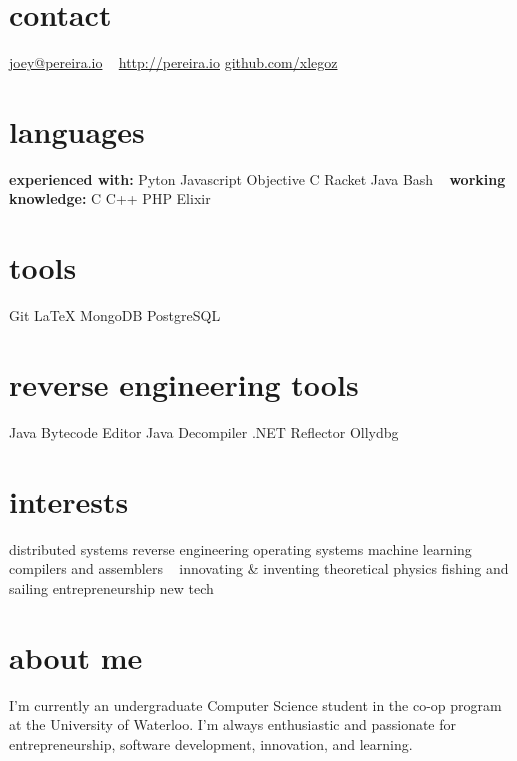 \documentclass[]{friggeri-cv-short}
\begin{document}

\begin{aside}
  \section{contact}
    \href{mailto:joey@pereira.io}{joey@pereira.io}
    ~
    \href{http://pereira.io}{http://pereira.io}
    \href{http://www.github.com/xlegoz}{github.com/xlegoz}
  \section{languages}
  \textbf{experienced with:}
    Pyton
    Javascript
    Objective C
  	Racket
  	Java
	Bash
	~
	\textbf{working knowledge:}
  	C
	C++
  	PHP
    Elixir
  \section{tools}
  	Git
  	\LaTeX
  	MongoDB
  	PostgreSQL
  \section{reverse engineering tools}
  	Java Bytecode Editor
  	Java Decompiler
  	.NET Reflector
  	Ollydbg
  \section{interests}
  	distributed systems
  	reverse engineering
  	operating systems
  	machine learning
  	compilers and assemblers
  	~
	innovating \& inventing
  	theoretical physics
  	fishing and sailing
  	entrepreneurship
  	new tech
\end{aside}


 \section{about me}
 I'm currently an undergraduate Computer Science student in the co-op program at the University of Waterloo. I'm always enthusiastic and passionate for entrepreneurship, software development, innovation, and learning.

\end{document}
